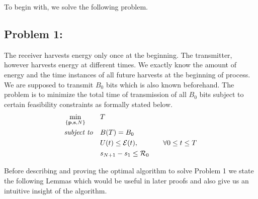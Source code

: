 To begin with, we solve the following problem.
\subsection{Problem 1:}
 The receiver harvests energy only once at the beginning. The transmitter, however harvests energy at different times. We exactly know the amount of energy and the time instances of all future harvests at the beginning of process.  We are supposed to transmit $B_0$ bits which is also known beforehand. The problem is to minimize the total time of transmission of all $B_0$ bits subject to certain feasibility constraints as formally stated below.
\begin{align}
&\min_{\{\textbf{p},\textbf{s},N\}}			&& T
\\
&\text{\textit{subject to}} 				&& B(T)=B_0
\\
&     										&& U(t)\le \mathcal{E}(t),  		&&& \forall 0\le t\le T
\\
&    										&& s_{N+1}-s_1\le \mathcal{R}_0
\end{align}

Before describing and proving the optimal algorithm to solve Problem 1 we state the following Lemmas which would be useful in later proofs and also give us an intuitive insight of the algorithm.



